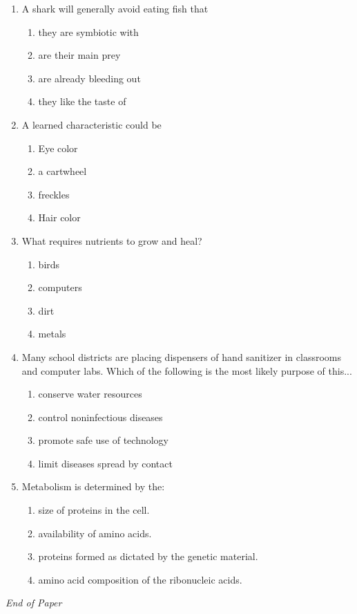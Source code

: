 \documentclass[12pt]{article}
\begin{document}
\begin{enumerate}[label=\arabic*.]
\begin{enumerate}[label=(\alph*)]
    \item pounds
    \item kilograms
    \item fluid ounces
    \item cubic centimeters
\end{enumerate}
\item A shark will generally avoid eating fish that
\begin{enumerate}[label=(\alph*)]
    \item they are symbiotic with
    \item are their main prey
    \item are already bleeding out
    \item they like the taste of
\end{enumerate}
\item A learned characteristic could be
\begin{enumerate}[label=(\alph*)]
    \item Eye color
    \item a cartwheel
    \item freckles
    \item Hair color
\end{enumerate}
\item What requires nutrients to grow and heal?
\begin{enumerate}[label=(\alph*)]
    \item birds
    \item computers
    \item dirt
    \item metals
\end{enumerate}
\item Many school districts are placing dispensers of hand sanitizer in classrooms and computer labs. Which of the following is the most likely purpose of this...
\begin{enumerate}[label=(\alph*)]
    \item conserve water resources
    \item control noninfectious diseases
    \item promote safe use of technology
    \item limit diseases spread by contact
\end{enumerate}
\item Metabolism is determined by the:
\begin{enumerate}[label=(\alph*)]
    \item size of proteins in the cell.
    \item availability of amino acids.
    \item proteins formed as dictated by the genetic material.
    \item amino acid composition of the ribonucleic acids.
\end{enumerate}
\end{enumerate}

\vfill
\noindent\textit{End of Paper}
\end{document}

